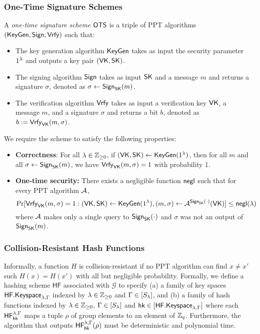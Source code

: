 \subsubsection{One-Time Signature Schemes} 
	A \emph{one-time signature scheme} $\mathsf{OTS}$ is a triple of PPT algorithms $(\mathsf{KeyGen},\mathsf{Sign},\mathsf{Vrfy})$ such that:
	\begin{itemize}
		\item The key generation algorithm $\mathsf{KeyGen}$ takes as input the security parameter $1^\lambda$ and outputs a key pair $(\mathsf{VK},\mathsf{SK})$.
		\item The signing algorithm $\mathsf{Sign}$ takes as input $\mathsf{SK}$ and a message $m$ and returns a signature $\sigma$, denoted as $\sigma\gets\mathsf{Sign}_{\mathsf{SK}}(m)$.
		\item The verification algorithm $\mathsf{Vrfy}$ takes as input a verification key $\mathsf{VK}$, a message $m$, and a signature $\sigma$ and returns a bit $b$, denoted as $b := \mathsf{Vrfy}_{\mathsf{VK}}(m,\sigma)$.
	\end{itemize}
	We require the scheme to satisfy the following properties:
	\begin{itemize}
		\item \textbf{Correctness}: For all $\lambda\in\mathbb{Z}_{\geq 0}$, if $(\mathsf{VK},\mathsf{SK})\gets\mathsf{KeyGen}(1^\lambda)$, then for all $m$ and all $\sigma\gets\mathsf{Sign}_{\mathsf{SK}}(m)$, we have $\mathsf{Vrfy}_{\mathsf{VK}}(m,\sigma)=1$ with probability 1.
		\item \textbf{One-time security:} There exists a negligible function $\mathsf{negl}$ such that for every PPT algorithm $\mathcal{A}$, $$\Pr[\mathsf{Vrfy}_{\mathsf{VK}}(m,\sigma)=1: (\mathsf{VK},\mathsf{SK})\gets\mathsf{KeyGen}(1^\lambda), (m,\sigma)\gets\mathcal{A}^{\mathsf{Sign}_{\mathsf{SK}}(\cdot)}(\mathsf{VK})]\leq\mathsf{negl}(\lambda)$$ where $\mathcal{A}$ makes only a single query to $\mathsf{Sign}_{\mathsf{SK}}(\cdot)$ and $\sigma$ was not an output of $\mathsf{Sign}_{\mathsf{SK}}(m)$.
	\end{itemize}


\subsubsection{Collision-Resistant Hash Functions}

Informally, a function $H$ is collision-resistant if no PPT algorithm can find $x\neq x'$ such $H(x)=H(x')$ with all but negligible probability. Formally, we define a hashing scheme $\mathsf{HF}$ associated with $\mathcal{G}$ to specify (a) a family of key spaces $\mathsf{HF.Keyspace}_{\lambda,\Gamma}$ indexed by $\lambda\in\mathbb{Z}_{\geq 0}$ and $\Gamma\in[S_\lambda]$, and (b) a family of hash functions indexed by $\lambda\in\mathbb{Z}_{\geq 0}$, $\Gamma\in[S_\lambda]$ and $\mathsf{hk}\in[\mathsf{HF.Keyspace}_{\lambda,\Gamma}]$ where each $\mathsf{HF}_{\mathsf{hk}}^{\lambda,\Gamma}$ maps a tuple $\rho$ of group elements to an element of $\mathbb{Z}_q$. Furthermore, the algorithm that outputs $\mathsf{HF}_{\mathsf{hk}}^{\lambda,\Gamma}(\rho)$ must be deterministic and polynomial time.

